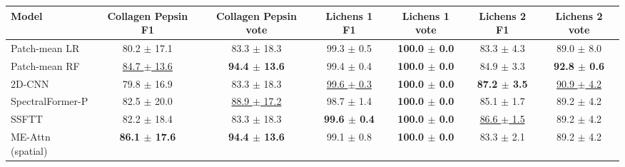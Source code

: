 \small
\begin{tabular}{lcccccc}
\toprule
Model & Collagen Pepsin F1 & Collagen Pepsin vote & Lichens 1 F1 & Lichens 1 vote & Lichens 2 F1 & Lichens 2 vote \\
\midrule
Patch-mean LR & 80.2 $\pm$ 17.1 & 83.3 $\pm$ 18.3 & 99.3 $\pm$ 0.5 & \textbf{100.0 $\pm$ 0.0} & 83.3 $\pm$ 4.3 & 89.0 $\pm$ 8.0 \\
Patch-mean RF & \underline{84.7 $\pm$ 13.6} & \textbf{94.4 $\pm$ 13.6} & 99.4 $\pm$ 0.4 & \textbf{100.0 $\pm$ 0.0} & 84.9 $\pm$ 3.3 & \textbf{92.8 $\pm$ 0.6} \\
2D-CNN & 79.8 $\pm$ 16.9 & 83.3 $\pm$ 18.3 & \underline{99.6 $\pm$ 0.3} & \textbf{100.0 $\pm$ 0.0} & \textbf{87.2 $\pm$ 3.5} & \underline{90.9 $\pm$ 4.2} \\
SpectralFormer-P & 82.5 $\pm$ 20.0 & \underline{88.9 $\pm$ 17.2} & 98.7 $\pm$ 1.4 & \textbf{100.0 $\pm$ 0.0} & 85.1 $\pm$ 1.7 & 89.2 $\pm$ 4.2 \\
SSFTT & 82.2 $\pm$ 18.4 & 83.3 $\pm$ 18.3 & \textbf{99.6 $\pm$ 0.4} & \textbf{100.0 $\pm$ 0.0} & \underline{86.6 $\pm$ 1.5} & 89.2 $\pm$ 4.2 \\
\midrule
ME-Attn (spatial) & \textbf{86.1 $\pm$ 17.6} & \textbf{94.4 $\pm$ 13.6} & 99.1 $\pm$ 0.8 & \textbf{100.0 $\pm$ 0.0} & 83.3 $\pm$ 2.1 & 89.2 $\pm$ 4.2 \\
\bottomrule
\end{tabular}
